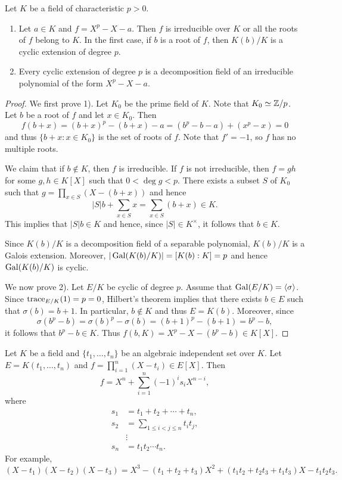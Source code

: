 \begin{proposition}
    Let $K$ be a field of characteristic $p>0$. 
    \begin{enumerate}
        \item Let $a\in K$ and $f=X^p-X-a$. Then 
        $f$ is irreducible over $K$ or all the roots of 
        $f$ belong to $K$. 
        In the first case, if $b$ is a root of $f$, then 
        $K(b)/K$ is a cyclic extension of degree $p$. 
        \item Every cyclic extension of degree $p$ 
        is a decomposition field of an irreducible
        polynomial of the form $X^p-X-a$. 
    \end{enumerate}
\end{proposition}

\begin{proof}
    We first prove 1). 
    Let $K_0$ be the prime field of $K$. Note that $K_0\simeq\mathbb{Z}/p$. 
    Let $b$ be a root of $f$ and let $x\in K_0$. 
    Then
    \[
    f(b+x)=(b+x)^p-(b+x)-a
    =(b^p-b-a)+(x^p-x)=0
    \]
    and thus $\{b+x:x\in K_0\}$ is the set of roots of $f$. Note that 
    $f'=-1$, so $f$ has no multiple roots. 
    
    We claim that if $b\not\in K$, then $f$ is irreducible. If 
    $f$ is not irreducible, then 
    $f=gh$ for some $g,h\in K[X]$ such that $0<\deg g<p$. There exists
    a subset $S$ of $K_0$ such that 
    $g=\prod_{x\in S}(X-(b+x))$ and hence
    \[
    |S|b+\sum_{x\in S}x=\sum_{x\in S}(b+x)\in K.
    \]
    This implies that $|S|b\in K$ and hence, since 
    $|S|\in K^{\times}$, it follows that 
    $b\in K$.
    
    Since $K(b)/K$ is a decomposition field of a separable polynomial, 
    $K(b)/K$ is a Galois extension. Moreover, 
    $|\operatorname{Gal}(K(b)/K)|=[K(b):K]=p$ and hence 
    $\operatorname{Gal}(K(b)/K)$ is cyclic. 
    
    We now prove 2). Let $E/K$ be cyclic of degree $p$. Assume
    that $\operatorname{Gal}(E/K)=\langle\sigma\rangle$. Since
    $\operatorname{trace}_{E/K}(1)=p=0$, Hilbert's theorem 
    implies that there exists $b\in E$ such that 
    $\sigma(b)=b+1$. In particular, $b\not\in K$
    and thus $E=K(b)$. Moreover, since 
    \[
    \sigma(b^p-b)=\sigma(b)^p-\sigma(b)=(b+1)^p-(b+1)=b^p-b, 
    \]
    it follows that $b^p-b\in K$. Thus 
    $f(b,K)=X^p-X-(b^p-b)\in K[X]$. 
\end{proof}


Let $K$ be a field and $\{t_1,\dots,t_n\}$ be an algebraic independent set over $K$. 
Let $E=K(t_1,\dots,t_n)$ and $f=\prod_{i=1}^n(X-t_i)\in E[X]$. 
Then
\[
f=X^n+\sum_{i=1}^n (-1)^i s_i X^{n-i},
\]
where 
\begin{align*}
    s_1 &= t_1+t_2+\cdots+t_n,\\
    s_2 &= \sum_{1\leq i<j\leq n}t_it_j,\\
    &\vdots\\
    s_n &= t_1t_2\cdots t_n.
\end{align*}
For example, 
\[
(X-t_1)(X-t_2)(X-t_3)=X^3-(t_1+t_2+t_3)X^2+(t_1t_2+t_2t_3+t_1t_3)X-t_1t_2t_3.
\]

